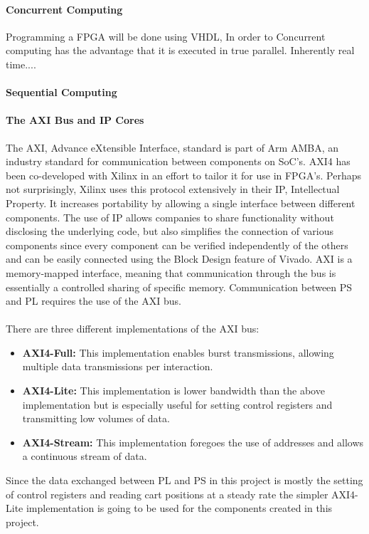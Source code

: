 \paragraph{Concurrent Computing} %
\label{par:concurrent_computing}
Programming a FPGA will be done using VHDL,
In order to   
Concurrent computing has the advantage that it is executed in true parallel.
Inherently real time....

\paragraph{Sequential Computing} %
\label{par:sequential_computing}

\paragraph{The AXI Bus and IP Cores} %
\label{par:the_axi_bus}
The AXI, Advance eXtensible Interface, standard is part of Arm AMBA, an industry standard for communication between components on SoC's.
AXI4 has been co-developed with Xilinx in an effort to tailor it for use in FPGA's.
Perhaps not surprisingly, Xilinx uses this protocol extensively in their IP, Intellectual Property.
It increases portability by allowing a single interface between different components.
The use of IP allows companies to share functionality without disclosing the underlying code, but also simplifies the connection of various components since every component can be verified independently of the others and can be easily connected using the Block Design feature of Vivado.
AXI is a memory-mapped interface, meaning that communication through the bus is essentially a controlled sharing of specific memory.
Communication between PS and PL requires the use of the AXI bus.
\\~\\
There are three different implementations of the AXI bus:
\begin{itemize}
	\item \textbf{AXI4-Full:} This implementation enables burst transmissions, allowing multiple data transmissions per interaction.
	\item \textbf{AXI4-Lite:} This implementation is lower bandwidth than the above implementation but is especially useful for setting control registers and transmitting low volumes of data.
	\item \textbf{AXI4-Stream:} This implementation foregoes the use of addresses and allows a continuous stream of data.
\end{itemize}
Since the data exchanged between PL and PS in this project is mostly the setting of control registers and reading cart positions at a steady rate the simpler AXI4-Lite implementation is going to be used for the components created in this project.
